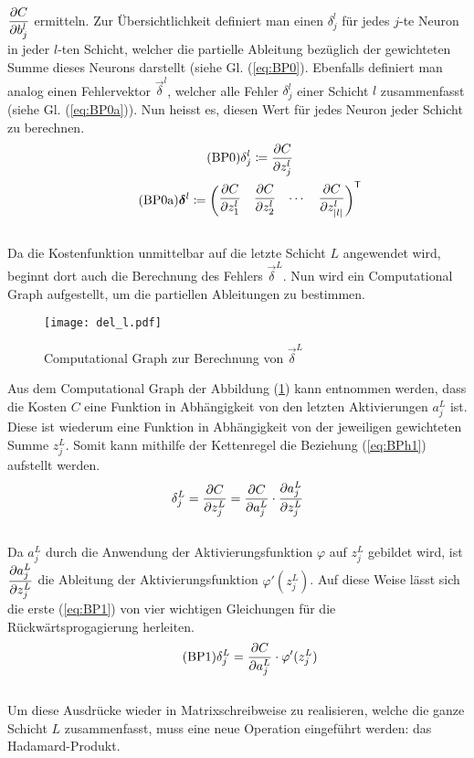 \begin{appendices}
$\displaystyle\frac{\partial C}{\partial b_j^l}$ ermitteln.
\para{}
Zur Übersichtlichkeit definiert man einen  $\delta_j^l$ für
jedes $j$-te Neuron in jeder $l$-ten Schicht, welcher die partielle Ableitung bezüglich der
gewichteten Summe dieses Neurons darstellt (siehe Gl. (\ref{eq:BP0}). Ebenfalls definiert man analog einen Fehlervektor
$\vec{\delta}^l$, welcher alle Fehler $\delta_j^l$ einer Schicht $l$
zusammenfasst (siehe Gl. (\ref{eq:BP0a})). Nun heisst es, diesen Wert für jedes Neuron jeder Schicht zu
berechnen.
\\
\begin{gather}
  \tag{BP0}\label{eq:BP0} \delta_j^l \coloneqq \frac{\partial C}{\partial z_j^l} \\
  \tag{BP0a}\label{eq:BP0a} \bm{\delta}^l \coloneqq \begin{pmatrix} \displaystyle\frac{\partial C}{\partial z_1^l} & \displaystyle\frac{\partial C}{\partial z_2^l} & \cdots & \displaystyle\frac{\partial C}{\partial z_{|l|}^l} \end{pmatrix}^{\mathsf{T}}
\end{gather}
\\
Da die Kostenfunktion unmittelbar auf die letzte Schicht $L$ angewendet wird, beginnt
dort auch die Berechnung des Fehlers $\vec{\delta}^L$.
Nun wird ein Computational Graph aufgestellt, um die partiellen Ableitungen zu bestimmen.
\para{}
\begin{figure}[h!]
  \centering
  \texttt{[image: del\_l.pdf]}
  \caption{Computational Graph zur Berechnung von $\vec{\delta}^L$}
  \label{fig:cg_L}
\end{figure}
\para{}
Aus dem Computational Graph der Abbildung (\ref{fig:cg_L}) kann entnommen werden, dass die Kosten $C$ eine Funktion
in Abhängigkeit von den letzten Aktivierungen $a_j^L$ ist. Diese ist wiederum
eine Funktion in Abhängigkeit von der jeweiligen gewichteten Summe $z_j^L$.
Somit kann mithilfe der Kettenregel die Beziehung (\ref{eq:BPh1})
aufstellt werden.
\\
\begin{equation}\label{eq:BPh1}
  \delta_j^L = \frac{\partial C}{\partial z_j^L} = \frac{\partial C}{\partial a_j^L} \cdot \frac{\partial a_j^L}{\partial z_j^L}
\end{equation}
\\
Da $a_j^L$ durch die Anwendung der Aktivierungsfunktion $\varphi$ auf $z_j^L$
gebildet wird, ist $\displaystyle\frac{\partial a_j^L}{\partial z_j^L}$ die Ableitung der Aktivierungsfunktion
$\varphi'(z_j^L)$. Auf diese Weise lässt sich die erste (\ref{eq:BP1}) von vier
wichtigen Gleichungen für die Rückwärtsprogagierung herleiten.
\\
\begin{equation}\tag{BP1}\label{eq:BP1}
  \delta_j^L = \frac{\partial C}{\partial a_j^L} \cdot \varphi'(z_j^L)
\end{equation}
\\
Um diese Ausdrücke wieder in Matrixschreibweise zu realisieren,
welche die ganze Schicht $L$ zusammenfasst, muss eine
neue Operation eingeführt werden: das Hadamard-Produkt.


\end{appendices}
